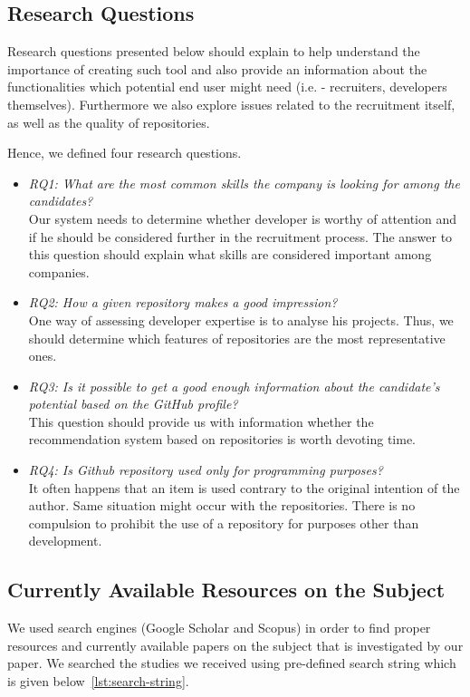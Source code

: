 \documentclass[graybox]{svmult}
\begin{document}
\subsection{Research Questions}
Research questions presented below should explain to help understand the importance of creating such tool and also provide an information about the functionalities which potential end user might need (i.e. - recruiters, developers themselves). Furthermore we also explore issues related to the recruitment itself, as well as the quality of repositories.

Hence, we defined four research questions.
\begin{itemize}
\item{\emph{RQ1: What are the most common skills the company is looking for among the candidates?}\\
  Our system needs to determine whether developer is worthy of attention and if he should be considered further in the recruitment process. The answer to this question should explain what skills are considered important among companies. }
\item{\emph{RQ2: How a given repository makes a good impression?}\\
  One way of assessing developer expertise is to analyse his projects. Thus, we should determine which features of repositories are the most representative ones.} 
\item{\emph{RQ3: Is it possible to get a good enough information about the candidate's potential based on the GitHub profile?}\\
  This question should provide us with information whether the recommendation system based on repositories is worth devoting time.} 
\item{\emph{RQ4: Is Github repository used only for programming purposes?}\\
  It often happens that an item is used contrary to the original intention of the author. Same situation might occur with the repositories. There is no compulsion to prohibit the use of a repository for purposes other than development.}
\end{itemize}

\subsection{Currently Available Resources on the Subject}
We used search engines (Google Scholar and Scopus) in order to find proper resources and currently available papers on the subject that is investigated by our paper. We searched the studies we received using pre-defined search string which is given below~\ref{lst:search-string}.
\end{document}

